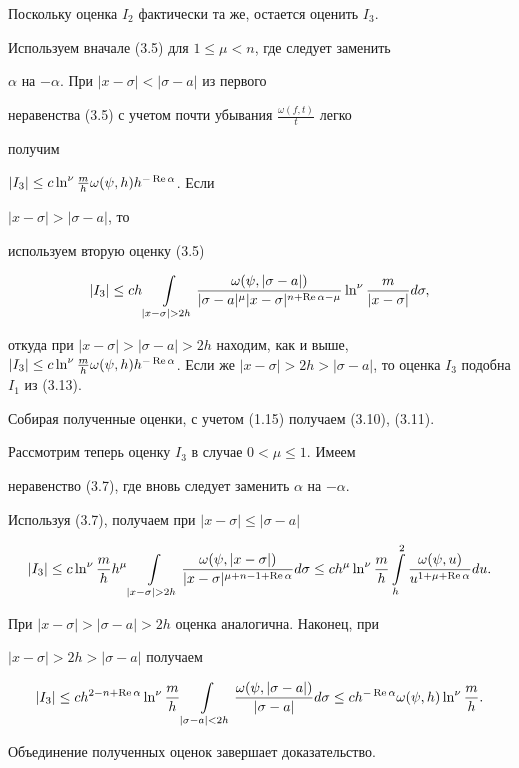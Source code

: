 \begin{pf}
Поскольку оценка $I_2$ фактически та же, остается оценить $I_3$.


Используем вначале (3.5) для $1\le \mu <n$, где следует заменить


$\alpha$ на $-\alpha$. При $|x-\sigma| < |\sigma-a|$ из первого


неравенства (3.5) с учетом почти убывания $\frac{\omega(f,t)}{t}$ легко


получим


$|I_3| \le c\ln^\nu \frac{m}{h} \omega(\psi,h) h^{-\operatorname{Re} \alpha}$. Если


$|x-\sigma| > |\sigma -a|$, то


используем вторую оценку (3.5)


$$


|I_3| \le ch \int \limits_{|x-\sigma|>2h} \frac{\omega(\psi,


|\sigma-a|)}{|\sigma-a|^\mu |x-\sigma|^{n+\re \alpha-\mu}}


\ln^\nu \frac{m}{|x-\sigma|} d\sigma,


$$


откуда при $|x-\sigma| > |\sigma-a| > 2h$ находим, как и выше, $|I_3| \le


c\ln^\nu \frac{m}{h} \omega(\psi,h) h^{-\re \alpha}$. Если же $|x-\sigma|


> 2h > |\sigma-a|$, то оценка $I_3$ подобна $I_1$ из (3.13).


Собирая полученные оценки, с учетом (1.15) получаем (3.10), (3.11).





Рассмотрим теперь оценку $I_3$ в случае $0 < \mu \le 1$. Имеем


неравенство (3.7), где вновь следует заменить $\alpha$ на $-\alpha$.


Используя (3.7), получаем при $|x-\sigma|\leq |\sigma-a|$


$$


|I_3| \le c\ln^\nu \frac{m}{h} h^\mu


\int \limits_{|x-\sigma|>2h} \frac{\omega(\psi,|x-\sigma|)}{|x-\sigma|^


{\mu+n-1+\re\alpha}} d\sigma


\le c h^\mu \ln^\nu \frac{m}{h} \int \limits_h^2 \frac{\omega


(\psi,u)}{u^{1+\mu+\re \alpha}} du.


$$


При $|x-\sigma| > |\sigma-a|>2h$ оценка аналогична. Наконец, при


$|x-\sigma| > 2h > |\sigma-a|$ получаем


$$


|I_3| \leq ch^{2-n+\re\alpha} \ln^\nu \frac{m}{h} \int \limits_{|\sigma-


a|<2h} \frac{\omega(\psi,|\sigma-a|)}{|\sigma-a|} d\sigma \le ch^{-\re


\alpha}\omega(\psi,h) \ln^\nu \frac{m}{h}.


$$


Объединение полученных оценок завершает доказательство.


\end{pf}





